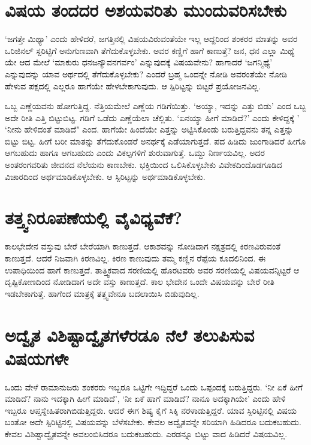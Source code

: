 \section*{ವಿಷಯ ತಂದದರ ಅಶಯವರಿತು ಮುಂದುವರಿಸಬೇಕು}

`ಜಗತ್ತೇ ಮಿಥ್ಯಾ' ಎಂದು ಹೇಳಿದರೆ, ಜಗತ್ತಿನಲ್ಲಿ ವಿಷಯವಿರುವಂತೆಯೇ ಇಲ್ಲ ಆದ್ದರಿಂದ ಶಂಕರರ ಮಾತನ್ನು ಅವರ ಒರಿಜಿನಲ್ ಸ್ಪರಿಟ್ಟಿಗೆ ಅನುಗುಣವಾಗಿ ತೆಗೆದುಕೊಳ್ಳಬೇಕು. ಅವರ ಕಣ್ಣಿಗೆ ಹಾಗೆ ಕಾಣುತ್ತೆ? ಜನ, ಧನ ಎಲ್ಲಾ ಮಿಥ್ಯೆ ಯೇ ಆದ ಮೇಲೆ `ಮಾಕುರು ಧನಜನ್ಯೌವನಗರ್ವಂ' ಎನ್ನುವುದಕ್ಕೆ ವಿಷಯವೇನು? ಹಾಗಾದರೆ `ಜಗನ್ಮಿಥ್ಯೆ' ಎನ್ನುವುದನ್ನು ಯಾವ ಅರ್ಥದಲ್ಲಿ ತೆಗೆದುಕೊಳ್ಳಬೇಕು? ಎಂದರೆ ಬ್ರಹ್ಮ ಒಂದನ್ನೇ ನೋಡಿ ಅವರಂತೆಯೇ ನೋಡಿ ಹೇಳುವ ಪಕ್ಷದಲ್ಲಿ ಎಲ್ಲರೂ ಹಾಗೆಯೇ ಹೇಳಬೇಕಾಗುವುದು. ಆ ಸ್ಪಿರಿಟ್ಟನ್ನು ಬಿಟ್ಟರೆ ಪ್ರಯೋಜನವಿಲ್ಲ.

ಒಬ್ಬ ಎಣ್ಣೆಯವನು ಹೋಗುತ್ತಿದ್ದ. ನೆತ್ತಿಯಮೇಲೆ ಎಣ್ಣೆಯ ಗಡಿಗೆಯಿತ್ತು. `ಅಯ್ಯಾ, ಇದನ್ನು ಎತ್ತು ಬಿಡು' ಎಂದ ಒಬ್ಬ ಅದೇ ರೀತಿ ಎತ್ತಿ ಬಿಟ್ಟುಬಿಟ್ಟ. ಗಡಿಗೆ ಒಡೆದು ಎಣ್ಣೆಯೆಲಾ ಚೆಲ್ಲಿತು. `ಏನಯ್ಯಾ ಹೀಗೆ ಮಾಡಿದೆ?' ಎಂದು ಕೇಳಿದ್ದಕ್ಕೆ ' `ನೀನು ಹೇಳಿದಂತೆ ಮಾಡಿದೆ" ಎಂದ. ಹಾಗೆಯೇ ಹಿಂದೆಯೇ ಎತ್ತನ್ನು ಅಟ್ಟಿಸಿಕೊಂಡು ಬರುತ್ತಿದ್ದವನು ತನ್ನ ಎತ್ತನ್ನು ಬಿಟ್ಟು ಬಿಟ್ಟ. ಹೀಗೆ ಬರೀ ಮಾತನ್ನು ತೆಗೆದುಕೊಂಡರೆ ಅನರ್ಥಕ್ಕೆ ಎಡೆಯಾಗುತ್ತದೆ. ಪದ ಹಿಡಿದು ಜುಂಗಾಡಿದರೆ ಹೀಗೊ ಆಗಬಹುದು ಹಾಗೂ ಆಗಬಹುದು ಎಂದು ವಿಕಲ್ಪಗಳಿಗೆ ಶುರುವಾಗುತ್ತೆ. ಒಮ್ದು ನಿರ್ಣಯವಿಲ್ಲ. ಅದರ ಅಂತರಂಗವರಿತು ಜೀವನದ ನೆಲೆಯನು ಕಾಣಬೇಕು. ಭಕ್ತಿಯಿಂದ ಒಲಿಸಿಕೊಳ್ಳಬೇಕು ವಿವೇಕದಿಂದೊಡಗೂಡಿದ ವಿಚಾರದಿಂದ ಅರ್ಥಮಾಡಿಕೊಳ್ಳಬೇಕು. ಆ ಸ್ಪಿರಿಟ್ಟನ್ನು ಅರ್ಥಮಾಡಿಕೊಳ್ಳಬೇಕು.

\section*{ತತ್ತ್ವನಿರೂಪಣೆಯಲ್ಲಿ ವೈವಿಧ್ಯವೆಕೆ?}

ಕಾಲಭೇದೇನ ವಸ್ತುವು ಬೇರೆ ಬೇರೆಯಾಗಿ ಕಾಣುತ್ತದೆ. ಆಕಾಶವನ್ನು ನೋಡಿದಾಗ ನಕ್ಷತ್ರದಲ್ಲಿ ಕಿರಣವಿರುವಂತೆ ಕಾಣುತ್ತದೆ. ಆದರೆ ನಿಜವಾಗಿ ಕಿರಣವಿಲ್ಲ. ಕಿರಣ ಕಾಣುವುದು ತಮ್ಮ ಕಣ್ಣಿನ ರೆಪ್ಪೆಯ ಕೂದಲಿನಿಂದ. ಈ ಉಪಾಧಿಯಿಂದ ಹಾಗೆ ಕಾಣುತ್ತದೆ. ತಾತ್ತ್ವಿಕವಾದ ಸರಣಿಯಲ್ಲಿ ಹೊರಟವರು ಅವರ ಸರಣಿಯಲ್ಲಿ ವಿಷಯವನ್ನಿಟ್ಟರೆ ಆ ದೃಷ್ಟಿಕೋಣದಿಂದ ನೋಡಿದಾಗ ಅದೇ ವಸ್ತು ಕಾಣುತ್ತದೆ. ಕಾಲ ಭೇದೇನ ಒಂದೇ ವಿಷಯವನ್ನು ಬೇರೆ ರೀತಿ ಇಡಬೇಕಾಗುತ್ತೆ. ಹಾಗೆಂದ ಮಾತ್ರಕ್ಕೆ ತತ್ತ್ವವೇನೂ ಬದಲಾಯಿಸಿ ಬಿಡುವುದಿಲ್ಲ.

\section*{ಅದ್ವೈತ ವಿಶಿಷ್ಟಾದ್ವೈತಗಳೆರಡೂ ನೆಲೆ ತಲುಪಿಸುವ ವಿಷಯಗಳೇ}

ಒಂದು ವೇಳೆ ರಾಮಾನುಜರು ಶಂಕರರು ಇಬ್ಬರೂ ಒಟ್ಟಿಗೇ ಇದ್ದಿದ್ದರೆ ಒಂದು ಒಪ್ಪಂದಕ್ಕೆ ಬರುತ್ತಿದ್ದರು. `ನೀ ಏಕೆ ಹೀಗೆ ಮಾಡಿದೆ? ನಾನು ಇದಕ್ಕಾಗಿ ಹೀಗೆ ಮಾಡಿದೆ', `ನೀ ಏಕೆ ಹಾಗೆ ಮಾಡಿದೆ? ನಾನೂ ಅದಕ್ಕಾಗಿಯೇ' ಎಂದು ಹೇಳಿ ಇಬ್ಬರೂ ಆಪ್ತಸ್ನೇಹಿತರಾಗಿಬಿಡುತ್ತಿದ್ದರು. ಆದರೆ ಈಗ ಶಿಷ್ಯ ಕೈಗೆ ಸಿಕ್ಕಿ ನರಳಾಡುತ್ತಿದ್ದರೆ. ಯಾವ ಸ್ಪಿರಿಟ್ಟಿನಲ್ಲಿ ವಿಷಯ ಬಂತೋ ಅದೇ ಸ್ಪಿರಿಟ್ಟಿನಲ್ಲಿ ವಿಷಯವನ್ನು ಬೆಳೆಸಬೇಕು. ಕೇವಲ ಅದ್ವೈತವನ್ನೇ ಸರಿಯಾಗಿ ಹಿಡಿದರೂ ಬದುಕಬಹುದು. ಕೇವಲ ವಿಶಿಷ್ಟಾದ್ವೈತವನ್ನೇ ಅವಲಂಬಿಸಿದರೂ ಬದುಕಬಹುದು. ಎರಡನ್ನೂ ಬಿಟ್ಟು ವಾದ ಹಿಡಿದರೆ ವಿಷಯವಿಲ್ಲ.

